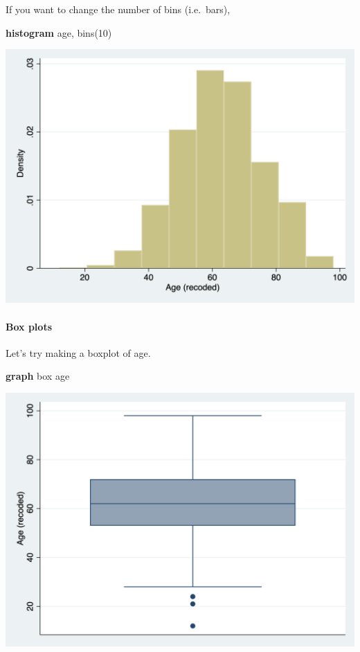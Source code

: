 \documentclass[
]{book}
\newenvironment{Shaded}{\begin{snugshade}}{\end{snugshade}}
\newcommand{\KeywordTok}[1]{\textcolor[rgb]{0.13,0.29,0.53}{\textbf{#1}}}
\newcommand{\NormalTok}[1]{#1}
\begin{document}
If you want to change the number of bins (i.e.~bars),

\begin{Shaded}
\begin{Highlighting}[]
\KeywordTok{histogram}\NormalTok{ age, bins(10)}
\end{Highlighting}
\end{Shaded}

\includegraphics{images/histogram_stata2.png}

\hypertarget{boxplot2}{%
\paragraph*{Box plots}\label{boxplot2}}

Let's try making a boxplot of age.

\begin{Shaded}
\begin{Highlighting}[]
\KeywordTok{graph}\NormalTok{ box age}
\end{Highlighting}
\end{Shaded}

\includegraphics{images/box_stata.png}
\end{document}
